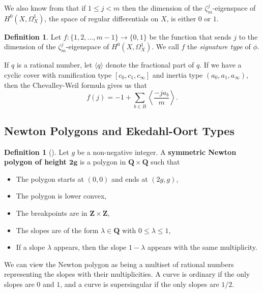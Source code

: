 \documentclass{article}
\theoremstyle{remark}
\theoremstyle{definition}
\newtheorem{definition}[theorem]{Definition}
\begin{document}
\par We also know from \cite{pries_newtonpolygons} that if $1 \leq j < m$ then the dimension of the $\zeta_m^j$-eigenspace of $H^0(X,\Omega_X^1)$, the space of regular differentials on $X$, is either $0$ or $1$.

\begin{definition}
    Let $f: \{1, 2, \ldots, m-1 \} \to \{0,1\}$ be the function that sends $j$ to the dimension of the $\zeta_m^j$-eigenspace of $H^0(X,\Omega_X^1)$. We call $f$ the \textit{signature type} of $\phi$.
\end{definition}

\par If $q$ is a rational number, let $\langle q \rangle$ denote the fractional part of $q$. If we have a cyclic cover with ramification type $[c_0,c_1,c_\infty]$ and inertia type $(a_0,a_1,a_\infty)$, then the Chevalley-Weil formula \cite[Theorem 2.10]{frediani} gives us that \[f(j) = -1 + \sum_{b \in B}\left \langle \frac{-ja_b}{m}\right \rangle.\]

\subsection{Newton Polygons and Ekedahl-Oort Types}
\begin{definition}[]
    Let $g$ be a non-negative integer. A \textbf{symmetric Newton polygon of height $\mathbf{2g}$} is a polygon in $\mathbf{Q} \times \mathbf{Q}$ such that
    \begin{itemize}
        \item The polygon starts at $(0,0)$ and ends at $(2g,g)$,
        \item The polygon is lower convex,
        \item The breakpoints are in $\mathbf{Z} \times \mathbf{Z}$,
        \item The slopes are of the form $\lambda \in \mathbf{Q}$ with $0 \leq \lambda \leq 1$,
        \item If a slope $\lambda$ appears, then the slope $1-\lambda$ appears with the same multiplicity.
    \end{itemize}
\end{definition}

\par We can view the Newton polygon as being a multiset of rational numbers representing the slopes with their multiplicities. A curve is ordinary if the only slopes are $0$ and $1$, and a curve is supersingular if the only slopes are $1/2$.
\end{document}
